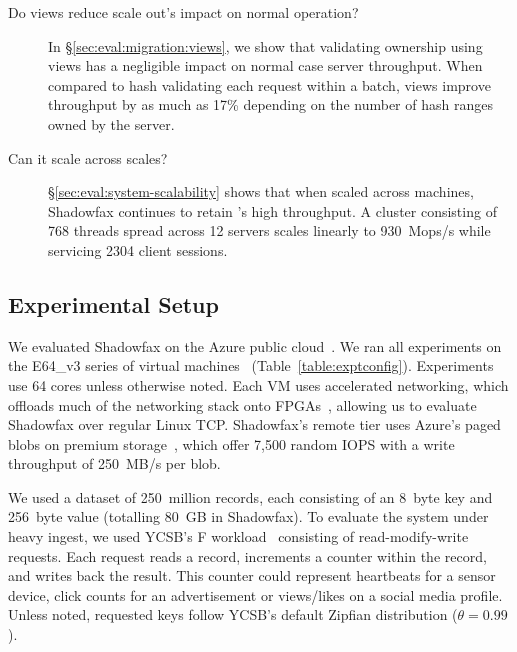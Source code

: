 \begin{description}
\item[Do views reduce scale out's impact on normal operation?]
  In \S\ref{sec:eval:migration:views}, we show that validating ownership
  using views has a negligible impact on normal case server throughput.
%
  When compared to hash validating each request within a batch, views
  improve throughput by as much as 17\% depending on the number of hash
  ranges owned by the server.

\item[Can it scale across scales?]
  \S\ref{sec:eval:system-scalability} shows that when scaled across
  machines, Shadowfax continues to retain \faster's high throughput.
%
  A cluster consisting of 768 threads spread across 12 servers scales
  linearly to 930~Mops/s while servicing 2304 client sessions.

\end{description}

%

\subsection{Experimental Setup}

We evaluated Shadowfax on the Azure public cloud~\cite{azure}.
%
We ran all experiments on the E64\_v3 series of virtual
machines~\cite{e64} (Table~\ref{table:exptconfig}).
%
Experiments use 64 cores unless otherwise noted.
%
Each VM uses accelerated networking, which offloads
much of the networking stack onto FPGAs~\cite{accel-nw}, allowing us to
evaluate Shadowfax over regular Linux TCP.
%
Shadowfax's remote tier uses Azure's paged blobs on premium
storage~\cite{page-blobs}, which offer 7,500 random IOPS with a write
throughput of 250~MB/s per blob.

We used a dataset of 250~million records, each consisting of
an 8~byte key and 256~byte value (totalling 80~GB in Shadowfax).
%
To evaluate the system under heavy ingest, we used YCSB's F
workload~\cite{ycsb} consisting of read-modify-write requests.
%
Each request reads a record, increments a counter within the record, and
writes back the result.
%
This counter could represent heartbeats for a sensor device, click
counts for an advertisement or views/likes on a social media profile.
%
Unless noted, requested keys follow YCSB's default Zipfian distribution ($\theta = 0.99$).

